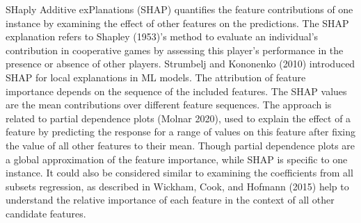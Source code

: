 \documentclass[11pt,twoside]{article}
\begin{document}
SHaply Additive exPlanations (SHAP) quantifies the feature contributions of one instance by examining the effect of other features on the predictions. The SHAP explanation refers to Shapley (1953)'s method to evaluate an individual's contribution in cooperative games by assessing this player's performance in the presence or absence of other players. Strumbelj and Kononenko (2010) introduced SHAP for local explanations in ML models. The attribution of feature importance depends on the sequence of the included features. The SHAP values are the mean contributions over different feature sequences. The approach is related to partial dependence plots (Molnar 2020), used to explain the effect of a feature by predicting the response for a range of values on this feature after fixing the value of all other features to their mean. Though partial dependence plots are a global approximation of the feature importance, while SHAP is specific to one instance. It could also be considered similar to examining the coefficients from all subsets regression, as described in Wickham, Cook, and Hofmann (2015) help to understand the relative importance of each feature in the context of all other candidate features.
\end{document}

